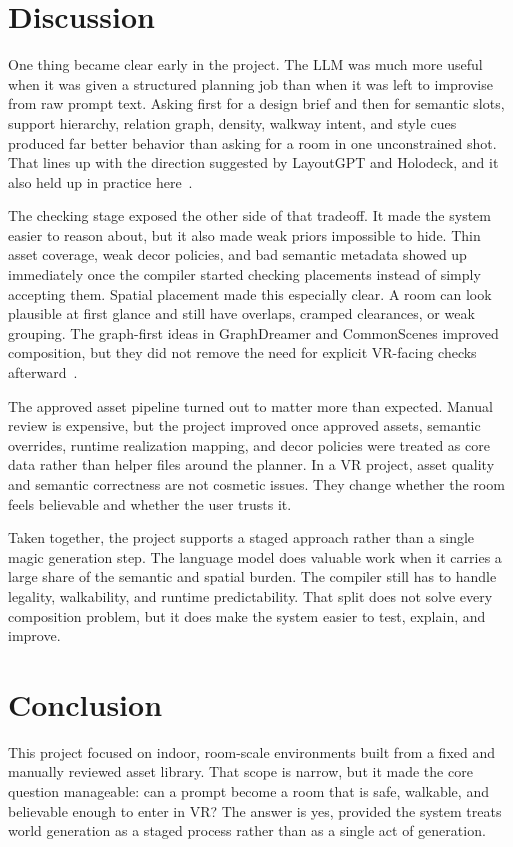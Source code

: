 \documentclass[12pt]{article}
\begin{document}
\section{Discussion}
One thing became clear early in the project. The LLM was much more useful when it was given a structured planning job than when it was left to improvise from raw prompt text. Asking first for a design brief and then for semantic slots, support hierarchy, relation graph, density, walkway intent, and style cues produced far better behavior than asking for a room in one unconstrained shot. That lines up with the direction suggested by LayoutGPT and Holodeck, and it also held up in practice here~\cite{Feng_2023_NeurIPS_LayoutGPT, Yang_2024_CVPR}.

The checking stage exposed the other side of that tradeoff. It made the system easier to reason about, but it also made weak priors impossible to hide. Thin asset coverage, weak decor policies, and bad semantic metadata showed up immediately once the compiler started checking placements instead of simply accepting them. Spatial placement made this especially clear. A room can look plausible at first glance and still have overlaps, cramped clearances, or weak grouping. The graph-first ideas in GraphDreamer and CommonScenes improved composition, but they did not remove the need for explicit VR-facing checks afterward~\cite{Gao_2024_CVPR_GraphDreamer, Zhai_2023_NeurIPS_CommonScenes}.

The approved asset pipeline turned out to matter more than expected. Manual review is expensive, but the project improved once approved assets, semantic overrides, runtime realization mapping, and decor policies were treated as core data rather than helper files around the planner. In a VR project, asset quality and semantic correctness are not cosmetic issues. They change whether the room feels believable and whether the user trusts it.

Taken together, the project supports a staged approach rather than a single magic generation step. The language model does valuable work when it carries a large share of the semantic and spatial burden. The compiler still has to handle legality, walkability, and runtime predictability. That split does not solve every composition problem, but it does make the system easier to test, explain, and improve.



\section{Conclusion}
This project focused on indoor, room-scale environments built from a fixed and manually reviewed asset library. That scope is narrow, but it made the core question manageable: can a prompt become a room that is safe, walkable, and believable enough to enter in VR? The answer is yes, provided the system treats world generation as a staged process rather than as a single act of generation.
\end{document}
